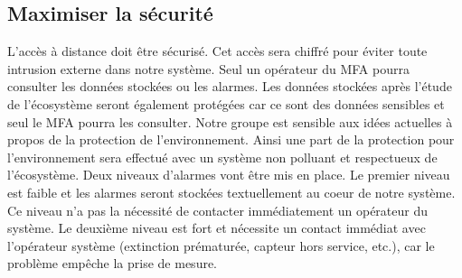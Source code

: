 

\subsection{Maximiser la sécurité}
\label{s:beo_obj_optisecu}

L’accès à distance doit être sécurisé. Cet accès sera chiffré pour éviter toute intrusion externe dans notre système. Seul un opérateur du MFA pourra consulter les données stockées ou les alarmes. Les données stockées après l’étude de l’écosystème seront également protégées car ce sont des données sensibles et seul le MFA pourra les consulter.
Notre groupe est sensible aux idées actuelles à propos de la protection de l’environnement. Ainsi une part de la protection pour l’environnement sera effectué avec un système non polluant et respectueux de l’écosystème. 
Deux niveaux d’alarmes vont être mis en place. Le premier niveau est faible et les alarmes seront stockées textuellement au coeur de notre système. Ce niveau n’a pas la nécessité de contacter immédiatement un opérateur du système. Le deuxième niveau est fort et nécessite un contact immédiat avec l’opérateur système (extinction prématurée, capteur hors service, etc.), car le problème empêche la prise de mesure.
